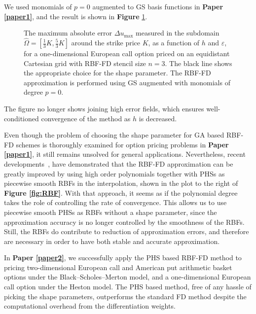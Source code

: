 \documentclass{UUThesisTemplate}
\begin{document}
\par
We used monomials of $p=0$ augmented to GS basis functions in \textbf{Paper \ref{paper1}}, and the result is shown in \textbf{Figure} \ref{fig:contour2}. 
\begin{figure}[H]
\centering


\caption{The maximum absolute error $\Delta u_{\max}$ measured in the subdomain $\hat\Omega=[\frac{1}{3}K,\frac{5}{3}K]$ around the strike price $K$, as a function of $h$ and $\varepsilon$, for a one-dimensional European call option priced on an equidistant Cartesian grid with RBF-FD stencil size $n=3$. The black line shows the appropriate choice for the shape parameter. The RBF-FD approximation is performed using GS augmented with monomials of degree $p=0$.}
\label{fig:contour2}
\end{figure}
\noindent The figure no longer shows joining high error fields, which ensures well-conditioned convergence of the method as $h$ is decreased.

\par
Even though the problem of choosing the shape parameter for GA based RBF-FD schemes is thoroughly examined for option pricing problems in \textbf{Paper \ref{paper1}}, it still remains unsolved for general applications. Nevertheless, recent developments~\cite{flyer2016on, bayona2017role}, have demonstrated that the RBF-FD approximation can be greatly improved by using high order polynomials together with PHSs as piecewise smooth RBFs in the interpolation, shown in the plot to the right of \textbf{Figure \ref{fig:RBF}}. With that approach, it seems as if the polynomial degree takes the role of controlling the rate of convergence. This allows us to use piecewise smooth PHSs as RBFs without a shape parameter, since the approximation accuracy is no longer controlled by the smoothness of the RBFs. Still, the RBFs do contribute to reduction of approximation errors, and therefore are necessary in order to have both stable and accurate approximation.

\par
In \textbf{Paper \ref{paper2}}, we successfully apply the PHS based RBF-FD method to pricing two-dimensional European call and American put arithmetic basket options under the Black--Scholes--Merton model, and a one-dimensional European call option under the Heston model. The PHS based method, free of any hassle of picking the shape parameters, outperforms the standard FD method despite the computational overhead from the differentiation weights.
%
\end{document}
